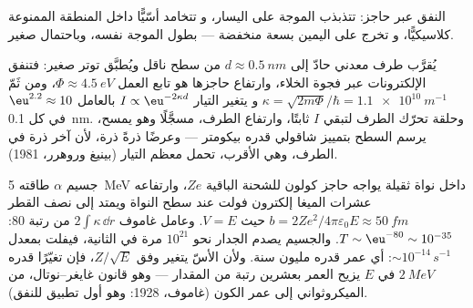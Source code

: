 \begin{omfigure}

{\small النفق عبر حاجز: تتذبذب الموجة على اليسار، و
تتخامد أسّيًّا داخل المنطقة الممنوعة كلاسيكيًّا، و
تخرج على اليمين بسعة منخفضة --- بطول الموجة نفسه،
وباحتمال صغير.}
\end{omfigure}

\begin{example}\label{ex:b2:potential-wells-tunneling:stm}
يُقرَّب طرف معدني حادّ إلى $d \approx \qty{0.5}{nm}$ من
سطح ناقل ويُطبَّق توتر صغير: فتنفق الإلكترونات عبر
فجوة الخلاء، وارتفاع حاجزها هو تابع العمل $\Phi \approx
\qty{4.5}{eV}$، ومن ثَمّ $\kappa = \sqrt{2m\Phi}/\hbar = \qty{1.1e10}{m^{-1}}$ و
يتغير التيار $I \propto \eu^{-2\kappa d}$ بالعامل $\eu^{2.2} \approx
10$ في كل \qty{0.1}{nm}. وحلقة  تحرّك الطرف لتبقي $I$
ثابتًا، وارتفاع الطرف، مسجَّلًا وهو يمسح، يرسم السطح
بتمييز شاقولي قدره بيكومتر --- وعرضًا ذرةً
ذرة، لأن آخر ذرة في الطرف، وهي الأقرب، تحمل معظم
التيار (بينيغ وروهرر، 1981).
\end{example}

\begin{example}\label{ex:b2:potential-wells-tunneling:alpha}
جسيم $\alpha$ طاقته \qty{5}{MeV} داخل نواة ثقيلة يواجه
حاجز كولون للشحنة الباقية $Ze$، وارتفاعه عشرات الميغا إلكترون فولت عند
سطح النواة ويمتد إلى نصف القطر $b = 2Ze^2/4\pi\varepsilon_0E
\approx \qty{50}{fm}$ حيث $V = E$. وعامل غاموف $2\int\kappa\,\dd r$
من رتبة $80$: $T \sim \eu^{-80} \sim 10^{-35}$. والجسيم يصدم الجدار
نحو $10^{21}$ مرة في الثانية، فيفلت بمعدل $\sim 10^{-14}
\,\unit{s^{-1}}$: أي عمر قدره مليون سنة. ولأن الأسّ
يتغير وفق $Z/\sqrt E$، فإن تغيّرًا قدره $\qty{2}{MeV}$ في $E$ يزيح العمر
بعشرين رتبة من المقدار --- وهو قانون غايغر--نوتال، من
الميكروثواني إلى عمر الكون (غاموف، 1928: وهو أول
تطبيق للنفق).
\end{example}

